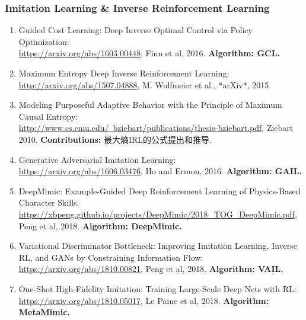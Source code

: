 \documentclass[lang=cn,11pt,a4paper]{eleganttemplate}
\begin{document}
\subsubsection{Imitation Learning \& Inverse Reinforcement Learning}
\begin{enumerate}
    \item Guided Cost Learning: Deep Inverse Optimal Control via Policy Optimization:\\ \href{https://arxiv.org/abs/1603.00448}{https://arxiv.org/abs/1603.00448}, Finn et al, 2016. \textbf{Algorithm: GCL.}
    \item Maximum Entropy Deep Inverse Reinforcement Learning:\\ \href{http://arxiv.org/abs/1507.04888}{http://arxiv.org/abs/1507.04888}, M. Wulfmeier et al., *arXiv*, 2015.
    \item Modeling Purposeful Adaptive Behavior with the Principle of Maximum Causal Entropy:\\ \href{http://www.cs.cmu.edu/~bziebart/publications/thesis-bziebart.pdf}{http://www.cs.cmu.edu/~bziebart/publications/thesis-bziebart.pdf}, Ziebart 2010. \textbf{Contributions:} 最大熵IRL的公式提出和推导.
    \item Generative Adversarial Imitation Learning:\\ \href{https://arxiv.org/abs/1606.03476}{https://arxiv.org/abs/1606.03476}, Ho and Ermon, 2016. \textbf{Algorithm: GAIL.}
    \item DeepMimic: Example-Guided Deep Reinforcement Learning of Physics-Based Character Skills:\\ \href{https://xbpeng.github.io/projects/DeepMimic/2018_TOG_DeepMimic.pdf}{https://xbpeng.github.io/projects/DeepMimic/2018\_TOG\_DeepMimic.pdf}, Peng et al, 2018. \textbf{Algorithm: DeepMimic.}
    \item Variational Discriminator Bottleneck: Improving Imitation Learning, Inverse RL, and GANs by Constraining Information Flow:\\ \href{https://arxiv.org/abs/1810.00821}{https://arxiv.org/abs/1810.00821}, Peng et al, 2018. \textbf{Algorithm: VAIL.}
    \item One-Shot High-Fidelity Imitation: Training Large-Scale Deep Nets with RL:\\ \href{https://arxiv.org/abs/1810.05017}{https://arxiv.org/abs/1810.05017}, Le Paine et al, 2018. \textbf{Algorithm: MetaMimic.}
\end{enumerate}
\end{document}
